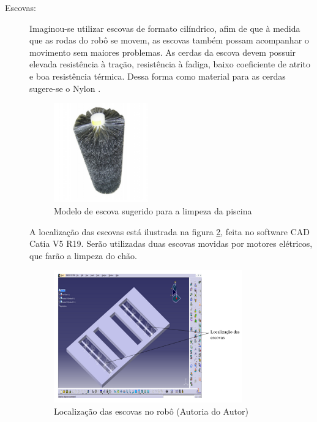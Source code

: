 \begin{description}
\item[Escovas:] Imaginou-se utilizar escovas de formato cilíndrico, afim de que
à medida que as rodas do robô se movem, as escovas também possam acompanhar o
movimento sem maiores problemas. As cerdas da escova devem possuir elevada
resistência à tração, resistência à fadiga, baixo coeficiente de atrito e boa
resistência térmica. Dessa forma como material para as cerdas sugere-se o
Nylon \cite{santos2010}.
\par
\begin{figure}[h]
  \centering
  \includegraphics[width=0.4\textwidth]{figures/brush.png}
  \caption{Modelo de escova sugerido para a limpeza da piscina \cite{santaclara2016}}
  \label{fig:brush}
\end{figure}
\FloatBarrier
A localização das escovas está ilustrada na figura \ref{fig:brush-local}, feita no software
\textsf{CAD Catia V5 R19}. Serão utilizadas duas escovas movidas por motores elétricos,
que farão a limpeza do chão.
\par
\begin{figure}[h]
  \centering
  \includegraphics[width=0.8\textwidth]{figures/brush-local.png}
  \caption{Localização das escovas no robô (\textsf{Autoria do Autor})}
  \label{fig:brush-local}
\end{figure}

\end{description}
